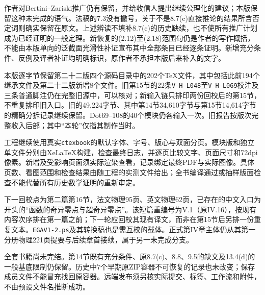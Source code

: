 作者对Bertini--Zariski推广仍有保留，并给收信人提出继续公理化的建议；本版保留这种未完成的语气。法稿的7.3没有撇号，关于不是8.7(c)直接推论的结果所含否定词则确实保留在原文。上述辨读不填补8.7(c)的历史缺续，也不使所有推广计划成为已经证明的一般定理。新恢复的(2.12)至(2.18)范围句仍是作者的写作概括，不能由本版单向的泛截面光滑性补证宣布其中全部条目已经逐条证明。新增充分条件、反例及译者补证均明确标识，原作者不承担本版后来补入的文字。

本版逐字节保留第二十二版四个源码目录中的202个TeX文件，其中包括此前194个继承文件及第二十二版新增8个文件。旧第15节的22条\texttt{V-H-L048}至\texttt{V-H-L069}校注及三条普通脚注仍在完整旧源中，可以核对；新输入链只排印两份回校后的第15节，不重复排印旧入口。旧的49,224字节、其中第14节34,610字节与第15节14,614字节的精确分拆记录继续保留。Dot69--108的40个模块仍各输入一次。旧报告按版次完整收入后部；其中“本轮”仅指其制作当时。

工程继续使用真实\texttt{ctexbook}的默认字体、字号、版心与双面分页。模块版和独立单文件分别由XeLaTeX构建，检查最终日志，并逐页比较文字、页面尺寸和72dpi像素。新增及受影响页面须实际渲染查看，记录绑定最终PDF与实际图像。具体页数、看图范围和检查结果由随工程的实测文件给出；全书编译通过或抽样版面检查不能代替所有历史数学证明的重新审定。

下一回校点为第二篇第16节，法文物理95页、英文物理62页，已存在的中文入口为开头的“函数的奇异零点与超奇异零点”。该短篇重编号为V.1（原IV.16），按现有内容次序排在第一篇之前；下一轮应回校其现有译文，而非在第15节后另排一份重复文本。\texttt{EGAV1-2.ps}及其转换稿也是需互校的载体。正式第IV章主体仍从其第一分册物理221页提要与后续章首接续，属于另一未完成分支。

全套书籍尚未完结。第14节既有充分条件、原8.7(c)、8.8、9.5的缺文及13.4(d)的一般基底限制仍保留。历史中7个早期原ZIP容器不可恢复的记录也未改变；保存成员文件不能冒充找回原容器。远端发布须另核实际提交、标签、工作流和附件，不由预设文件名推断成功。
